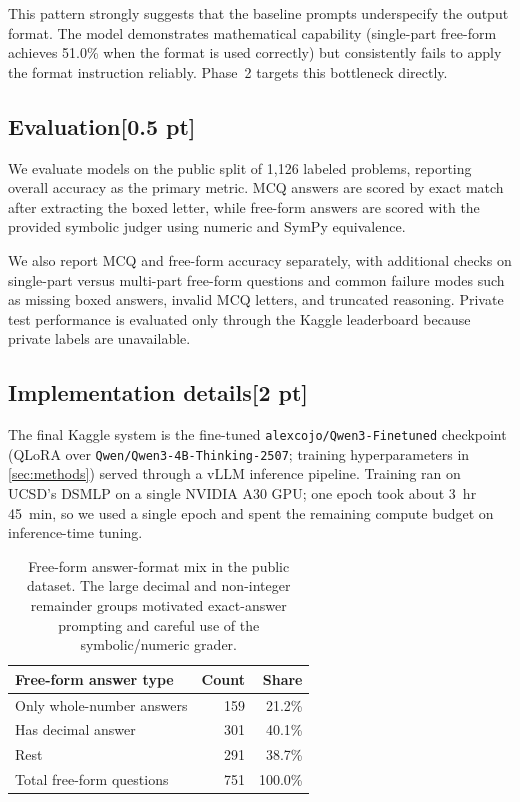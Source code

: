 \documentclass{article}
\begin{document}
This pattern strongly suggests that the baseline prompts underspecify the output format. The model demonstrates mathematical capability (single-part free-form achieves 51.0\% when the format is used correctly) but consistently fails to apply the format instruction reliably. Phase~2 targets this bottleneck directly.

% 
\subsection{Evaluation[0.5 pt]}
\label{sec:evaluation}

We evaluate models on the public split of 1,126 labeled problems, reporting overall accuracy as the primary metric. MCQ answers are scored by exact match after extracting the boxed letter, while free-form answers are scored with the provided symbolic judger using numeric and SymPy equivalence.

We also report MCQ and free-form accuracy separately, with additional checks on single-part versus multi-part free-form questions and common failure modes such as missing boxed answers, invalid MCQ letters, and truncated reasoning. Private test performance is evaluated only through the Kaggle leaderboard because private labels are unavailable.
% 
\subsection{Implementation details[2 pt]}
\label{sec:implementation_details}
The final Kaggle system is the fine-tuned \texttt{alexcojo/Qwen3-Finetuned} checkpoint (QLoRA over
\texttt{Qwen/Qwen3-4B-Thinking-2507}; training hyperparameters in \cref{sec:methods}) served through a
vLLM inference pipeline. Training ran on UCSD's DSMLP on a single NVIDIA A30 GPU; one epoch took about
3~hr 45~min, so we used a single epoch and spent the remaining compute budget on inference-time tuning.

\begin{table}[h]
  \caption{Free-form answer-format mix in the public dataset.  The large decimal and non-integer remainder groups motivated exact-answer prompting and careful use of the symbolic/numeric grader.}
  \label{tab:free_form_answer_types_impl}
  \centering
  \begin{tabular}{lrr}
    \toprule
    Free-form answer type & Count & Share \\
    \midrule
    Only whole-number answers & 159 & 21.2\% \\
    Has decimal answer & 301 & 40.1\% \\
    Rest & 291 & 38.7\% \\
    \midrule
    Total free-form questions & 751 & 100.0\% \\
    \bottomrule
  \end{tabular}
\end{table}
\end{document}
